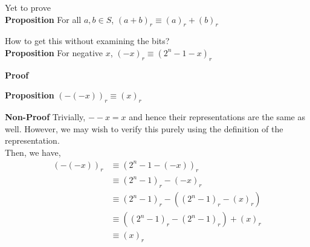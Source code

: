 \documentclass{article}
\begin{document}
Yet to prove\\
\textbf{Proposition} For all $a,b\in S$, $(a+b)_r
\equiv(a)_r+(b)_r$


How to get this without examining the bits?\\
\textbf{Proposition} For negative $x$, $(-x)_r\equiv (2^n-1-x)_r$

\textbf{Proof}  


\textbf{Proposition} $(-(-x))_r\equiv (x)_r$

\textbf{Non-Proof} Trivially, $--x=x$ and hence their representations are the same as well. However, we may wish to verify this purely using the definition of the representation. \\
Then, we have, \begin{align*}
	(-(-x))_r &\equiv (2^n-1-(-x))_r \\
	&\equiv (2^n-1)_r-(-x)_r \\ 
	&\equiv (2^n-1)_r-((2^n-1)_r-(x)_r) \\
	&\equiv ((2^n-1)_r-(2^n-1)_r)+(x)_r \\
	&\equiv (x)_r
\end{align*}
\end{document}
